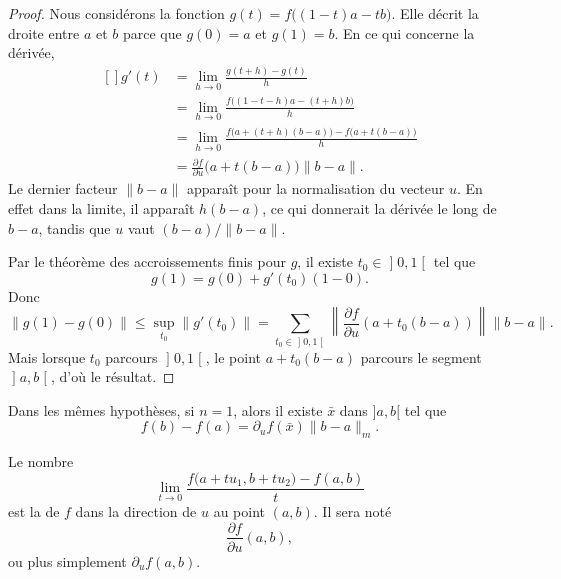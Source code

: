 \begin{proof}
	Nous considérons la fonction $g(t)=f\big( (1-t)a-tb \big)$. Elle décrit la droite entre $a$ et $b$ parce que $g(0)=a$ et $g(1)=b$. En ce qui concerne la dérivée,
	\begin{equation}
		\begin{aligned}[]
			g'(t)&=\lim_{h\to 0} \frac{ g(t+h)-g(t) }{ h }\\
			&=\lim_{h\to 0} \frac{ f\big( (1-t-h)a-(t+h)b \big) }{ h }\\
			&=\lim_{h\to 0} \frac{ f\big( a+(t+h)(b-a) \big)-f\big( a+t(b-a) \big) }{ h }\\
			&=\frac{ \partial f }{ \partial u }\big( a+t(b-a) \big)\| b-a \|.
		\end{aligned}
	\end{equation}
	Le dernier facteur $\| b-a \|$ apparaît pour la normalisation du vecteur $u$. En effet dans la limite, il apparaît $h(b-a)$, ce qui donnerait la dérivée le long de $b-a$, tandis que $u$ vaut $(b-a)/\| b-a \|$.

	Par le théorème des accroissements finis pour $g$, il existe $t_0\in\mathopen] 0 , 1 \mathclose[$ tel que
	\begin{equation}
		g(1)=g(0)+g'(t_0)(1-0).
	\end{equation}
	Donc
	\begin{equation}
		\| g(1)-g(0) \|\leq\sup_{t_0}\| g'(t_0) \|=\sum_{t_0\in\mathopen] 0 , 1 \mathclose[}\left\| \frac{ \partial f }{ \partial u }(a+t_0(b-a)) \right\|\| b-a \|.
	\end{equation}
	Mais lorsque $t_0$ parcours $\mathopen] 0 , 1 \mathclose[$, le point $a+t_0(b-a)$ parcours le segment $\mathopen] a , b \mathclose[$, d'où le résultat.
\end{proof}

\begin{corollary}
	Dans les mêmes hypothèses, si $n=1$, alors il existe $\bar x $ dans $]a,b[$ tel que
	\[
		f(b)-f(a)=\partial_uf(\bar x)\|b-a\|_m.
	\]
\end{corollary}

\begin{definition}
    Le nombre
    \begin{equation}
        \lim_{t\to 0} \frac{ f\big( a+tu_1,b+tu_2 \big)-f(a,b) }{ t }
    \end{equation}
    est la  de $f$ dans la direction de $u$ au point $(a,b)$. Il sera noté
    \begin{equation}
        \frac{ \partial f }{ \partial u }(a,b),
    \end{equation}
    ou plus simplement $\partial_uf(a,b)$.
\end{definition}

